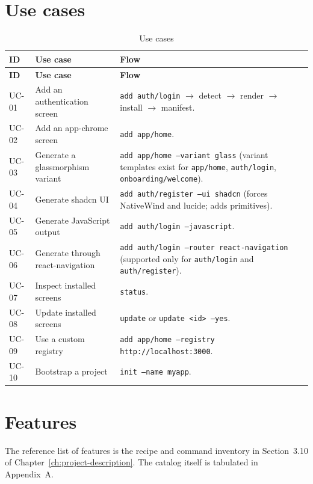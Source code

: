 \section{Use cases}

\begin{longtable}{@{}L{2.2cm}L{5.2cm}L{7.2cm}@{}}
\caption{Use cases}\\
\toprule
\textbf{ID} & \textbf{Use case} & \textbf{Flow} \\
\midrule
\endfirsthead
\toprule
\textbf{ID} & \textbf{Use case} & \textbf{Flow} \\
\midrule
\endhead
UC-01 & Add an authentication screen & \texttt{add auth/login} $\rightarrow$ detect $\rightarrow$ render $\rightarrow$ install $\rightarrow$ manifest. \\
UC-02 & Add an app-chrome screen & \texttt{add app/home}. \\
UC-03 & Generate a glassmorphism variant & \texttt{add app/home --variant glass} (variant templates exist for \texttt{app/home}, \texttt{auth/login}, \texttt{onboarding/welcome}). \\
UC-04 & Generate shadcn UI & \texttt{add auth/register --ui shadcn} (forces NativeWind and lucide; adds primitives). \\
UC-05 & Generate JavaScript output & \texttt{add auth/login --javascript}. \\
UC-06 & Generate through react-navigation & \texttt{add auth/login --router react-navigation} (supported only for \texttt{auth/login} and \texttt{auth/register}). \\
UC-07 & Inspect installed screens & \texttt{status}. \\
UC-08 & Update installed screens & \texttt{update} or \texttt{update <id> --yes}. \\
UC-09 & Use a custom registry & \texttt{add app/home --registry http://localhost:3000}. \\
UC-10 & Bootstrap a project & \texttt{init --name myapp}. \\
\bottomrule
\end{longtable}

\section{Features}

The reference list of features is the recipe and command inventory in
Section~3.10 of Chapter~\ref{ch:project-description}. The catalog itself is
tabulated in Appendix~A.

